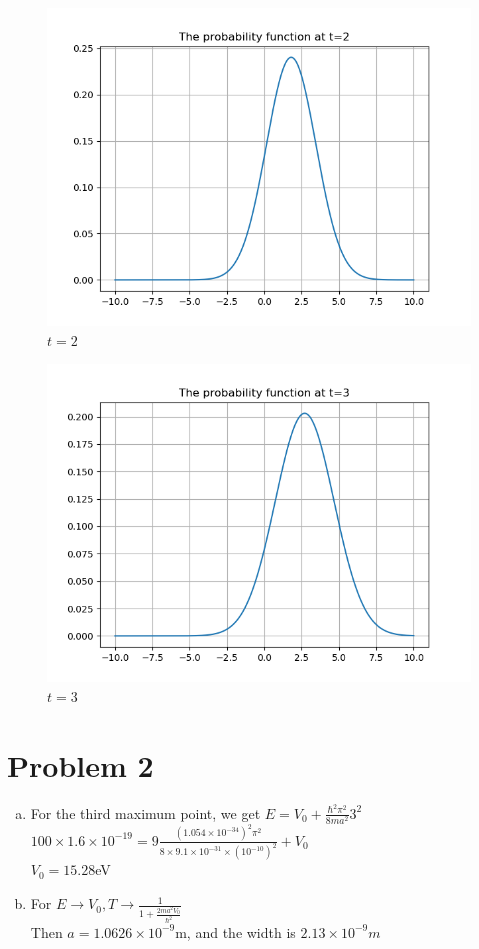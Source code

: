 \documentclass[a4paper]{article}
\begin{document}
    \begin{figure}[H]
        \centering
        \includegraphics[scale=0.75]{P1-2.png}
        \caption{$t=2$}
    \end{figure}
    \begin{figure}[H]
        \centering
        \includegraphics[scale=0.75]{P1-3.png}
        \caption{$t=3$}
    \end{figure}
\section{Problem 2}
\begin{enumerate}[(a)]
    \item For the third maximum point, we get $E=V_0+\frac{\hbar^2\pi^2}{8ma^2}3^2$
    \\$100\times1.6\times10^{-19}=9\frac{(1.054\times10^{-34})^2\pi^2}{8\times9.1\times10^{-31}\times(10^{-10})^2}+V_0$
    \\$V_0=15.28$eV
    \item For $E\rightarrow V_0, T\rightarrow\frac{1}{1+\frac{2ma^2V_0}{\hbar^2}}$
    \\Then $a=1.0626\times10^{-9}$m, and the width is $2.13\times10^{-9}m$
\end{enumerate}
\end{document}
